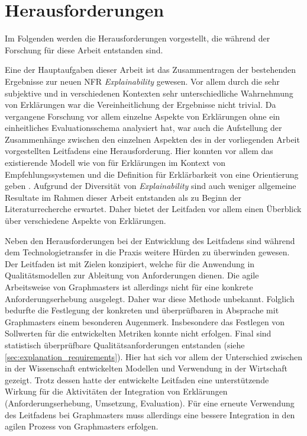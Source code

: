 \section{Herausforderungen}

Im Folgenden werden die Herausforderungen vorgestellt, die während der Forschung für diese Arbeit entstanden sind.

Eine der Hauptaufgaben dieser Arbeit ist das Zusammentragen der bestehenden Ergebnisse zur neuen NFR \textit{Explainability} gewesen. Vor allem durch die sehr subjektive und in verschiedenen Kontexten sehr unterschiedliche Wahrnehmung von Erklärungen war die Vereinheitlichung der Ergebnisse nicht trivial. Da vergangene Forschung vor allem einzelne Aspekte von Erklärungen ohne ein einheitliches Evaluationsschema analysiert hat, war auch die Aufstellung der Zusammenhänge zwischen den einzelnen Aspekten des in der vorliegenden Arbeit vorgestellten Leitfadens eine Herausforderung. Hier konnten vor allem das existierende Modell wie von \citeauthor{nunes_systematic_2017} für Erklärungen im Kontext von Empfehlungssystemen und die Definition für Erklärbarkeit von \citeauthor{chazette_knowledge_nodate} eine Orientierung geben \cite{nunes_systematic_2017, chazette_knowledge_nodate}. Aufgrund der Diversität von \textit{Explainability} sind auch weniger allgemeine Resultate im Rahmen dieser Arbeit entstanden als zu Beginn der Literaturrecherche erwartet. Daher bietet der Leitfaden vor allem einen Überblick über verschiedene Aspekte von Erklärungen.

Neben den Herausforderungen bei der Entwicklung des Leitfadens sind während dem Technologietransfer in die Praxis weitere Hürden zu überwinden gewesen. Der Leitfaden ist mit Zielen konzipiert, welche für die Anwendung in Qualitätsmodellen zur Ableitung von Anforderungen dienen. Die agile Arbeitsweise von Graphmasters ist allerdings nicht für eine konkrete Anforderungserhebung ausgelegt. Daher war diese Methode unbekannt. Folglich bedurfte die Festlegung der konkreten und überprüfbaren in Absprache mit Graphmasters einem besonderen Augenmerk. Insbesondere das Festlegen von Sollwerten für die entwickelten Metriken konnte nicht erfolgen. Final sind statistisch überprüfbare Qualitätsanforderungen entstanden (siehe \autoref{sec:explanation_requirements}). Hier hat sich vor allem der Unterschied zwischen in der Wissenschaft entwickelten Modellen und Verwendung in der Wirtschaft gezeigt. Trotz dessen hatte der entwickelte Leitfaden eine unterstützende Wirkung für die Aktivitäten der Integration von Erklärungen (Anforderungserhebung, Umsetzung, Evaluation). Für eine erneute Verwendung des Leitfadens bei Graphmasters muss allerdings eine bessere Integration in den agilen Prozess von Graphmasters erfolgen.